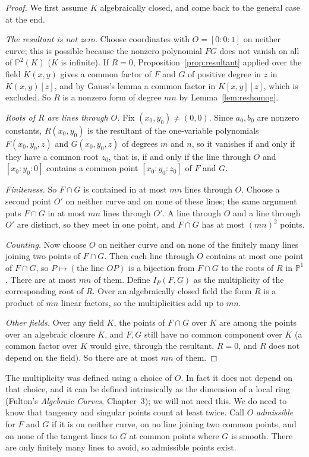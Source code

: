 \begin{proof}
We first assume $K$ algebraically closed, and come back to the general case at the end.

\emph{The resultant is not zero.} Choose coordinates with $O=[0:0:1]$ on neither curve; this is possible because the nonzero polynomial $FG$ does not
vanish on all of $\mathbb P^2(K)$ ($K$ is infinite). If $R=0$, Proposition~\ref{prop:resultant} applied over the field $K(x,y)$ gives a common factor of
$F$ and $G$ of positive degree in $z$ in $K(x,y)[z]$, and by Gauss's lemma a common factor in $K[x,y][z]$, which is excluded. So $R$ is a nonzero form of
degree $mn$ by Lemma~\ref{lem:reshomog}.

\emph{Roots of $R$ are lines through $O$.} Fix $(x_0,y_0)\ne(0,0)$. Since $a_0,b_0$ are nonzero constants, $R(x_0,y_0)$ is the resultant of the
one-variable polynomials $F(x_0,y_0,z)$ and $G(x_0,y_0,z)$ of degrees $m$ and $n$, so it vanishes if and only if they have a common root $z_0$, that is, if and only
if the line through $O$ and $[x_0:y_0:0]$ contains a common point $[x_0:y_0:z_0]$ of $F$ and $G$.

\emph{Finiteness.} So $F\cap G$ is contained in at most $mn$ lines through $O$. Choose a second point $O'$ on neither curve and on none of these lines;
the same argument puts $F\cap G$ in at most $mn$ lines through $O'$. A line through $O$ and a line through $O'$ are distinct, so they meet in one point, and
$F\cap G$ has at most $(mn)^2$ points.

\emph{Counting.} Now choose $O$ on neither curve and on none of the finitely many lines joining two points of $F\cap G$. Then each line through $O$
contains at most one point of $F\cap G$, so $P\mapsto(\text{the line }OP)$ is a bijection from $F\cap G$ to the roots of $R$ in $\mathbb P^1$. There are at
most $mn$ of them. Define $I_P(F,G)$ as the multiplicity of the corresponding root of $R$. Over an algebraically closed field the form $R$ is a product of
$mn$ linear factors, so the multiplicities add up to $mn$.

\emph{Other fields.} Over any field $K$, the points of $F\cap G$ over $K$ are among the points over an algebraic closure $\overline K$,
and $F,G$ still have no common component over $\overline K$ (a common factor over $\overline K$ would give, through the resultant, $R=0$, and $R$ does not
depend on the field). So there are at most $mn$ of them.
\end{proof}

The multiplicity was defined using a choice of $O$. In fact it does not depend on that choice, and it can be defined intrinsically as the dimension of a
local ring (Fulton's \emph{Algebraic Curves}, Chapter~3); we will not need this. We do need to know that tangency and singular points count at least twice.
Call $O$ \emph{admissible} for $F$ and $G$ if it is on neither curve, on no line joining two common points, and on none of the tangent lines to $G$ at
common points where $G$ is smooth. There are only finitely many lines to avoid, so admissible points exist.


